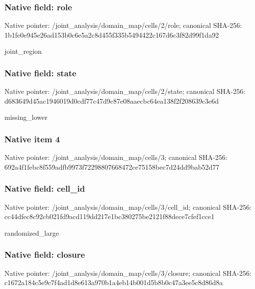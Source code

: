 \documentclass[10pt,a4paper]{article}
\begin{document}
\subsubsection{Native field: role}
Native pointer: /joint\_\allowbreak{}analysis/domain\_\allowbreak{}map/cells/2/role; canonical SHA-256: 1b1fe0e945e26ad153b0c6e5a2c8d455f335b5494422c167d6c3f82d99f1da92

\begingroup\raggedright\sloppy joint\_\allowbreak{}region\par\endgroup

\subsubsection{Native field: state}
Native pointer: /joint\_\allowbreak{}analysis/domain\_\allowbreak{}map/cells/2/state; canonical SHA-256: d683649d45ac1946019d0cdf77c47d9c87e08aaecbc64ea138f2f208639c3e6d

\begingroup\raggedright\sloppy missing\_\allowbreak{}lower\par\endgroup

\subsubsection{Native item 4}
Native pointer: /joint\_\allowbreak{}analysis/domain\_\allowbreak{}map/cells/3; canonical SHA-256: 692a4f1febc8f559adfb9973f72298807668472ce75158bec7d24dd9bab52d77

\subsubsection{Native field: cell\_\allowbreak{}id}
Native pointer: /joint\_\allowbreak{}analysis/domain\_\allowbreak{}map/cells/3/cell\_\allowbreak{}id; canonical SHA-256: cc44dfec8c92cb021fd9acd119dd217e1bc380275be2121f88dece7cfef1cce1

\begingroup\raggedright\sloppy randomized\_\allowbreak{}large\par\endgroup

\subsubsection{Native field: closure}
Native pointer: /joint\_\allowbreak{}analysis/domain\_\allowbreak{}map/cells/3/closure; canonical SHA-256: c1672a184c5e9c7f4ad1d8e613a970b1a4eb14b001d5b8b0c47a3ee5c8d86d8a
\end{document}
